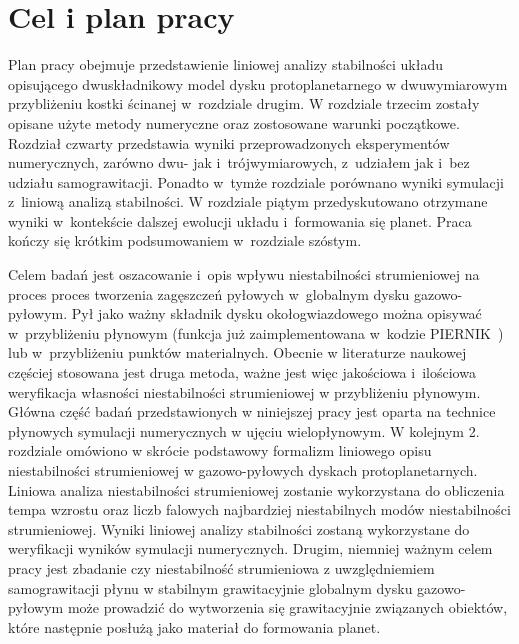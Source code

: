 \section{Cel i plan pracy}
Plan pracy obejmuje przedstawienie liniowej analizy stabilności układu
opisującego dwuskładnikowy model dysku protoplanetarnego w dwuwymiarowym
przybliżeniu kostki ścinanej w~rozdziale drugim. W rozdziale trzecim zostały
opisane użyte metody numeryczne oraz zostosowane warunki początkowe. Rozdział
czwarty przedstawia wyniki przeprowadzonych eksperymentów numerycznych, zarówno
dwu- jak i~trójwymiarowych, z~udziałem jak i~bez udziału samograwitacji. Ponadto
w~tymże rozdziale porównano wyniki symulacji z~liniową analizą stabilności. W
rozdziale piątym przedyskutowano otrzymane wyniki w~kontekście dalszej ewolucji
układu i~formowania się planet. Praca kończy się krótkim podsumowaniem
w~rozdziale szóstym.
\par Celem badań jest oszacowanie i~opis wpływu niestabilności strumieniowej na
proces proces tworzenia zagęszczeń pyłowych w~globalnym dysku gazowo-pyłowym.
Pył jako ważny składnik dysku okołogwiazdowego można opisywać w~przybliżeniu
płynowym (funkcja już zaimplementowana w~kodzie \textsc{PIERNIK}~\cite{piernik2}) lub
w~przybliżeniu punktów materialnych. Obecnie w literaturze naukowej częściej
stosowana jest druga metoda, ważne jest więc jakościowa i~ilościowa weryfikacja
własności niestabilności strumieniowej w przybliżeniu płynowym. 
Główna część badań przedstawionych w niniejszej pracy jest oparta na technice
płynowych symulacji numerycznych w ujęciu wielopłynowym. W kolejnym 2. rozdziale
omówiono w skrócie podstawowy formalizm liniowego opisu niestabilności
strumieniowej w  gazowo-pyłowych dyskach protoplanetarnych.  Liniowa analiza
niestabilności strumieniowej zostanie wykorzystana do obliczenia tempa wzrostu
oraz liczb falowych najbardziej niestabilnych modów niestabilności
strumieniowej. Wyniki liniowej analizy stabilności zostaną wykorzystane do
weryfikacji wyników symulacji numerycznych.
Drugim, niemniej
ważnym celem pracy jest zbadanie czy niestabilność strumieniowa z uwzględniemiem
samograwitacji płynu w stabilnym grawitacyjnie globalnym dysku gazowo-pyłowym
może prowadzić do wytworzenia się grawitacyjnie związanych obiektów, które
następnie posłużą jako materiał do formowania planet.

